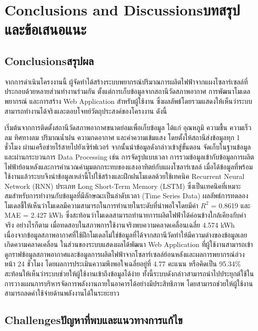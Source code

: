 \chapter{\ifenglish Conclusions and Discussions\else บทสรุปและข้อเสนอแนะ\fi}

\section{\ifenglish Conclusions\else สรุปผล\fi}
\hspace{\parindent} จากการดำเนินโครงงานนี้ ผู้จัดทำได้สร้างระบบพยากรณ์ปริมาณการผลิตไฟฟ้าจากแผงโซลาร์เซลล์ที่ประกอบด้วยหลายส่วนทำงานร่วมกัน ตั้งแต่การเก็บข้อมูลจากสถานีวัดสภาพอากาศ การพัฒนาโมเดลพยากรณ์ และการสร้าง Web Application สำหรับผู้ใช้งาน ซึ่งผลลัพธ์โดยรวมแสดงให้เห็นว่าระบบสามารถทำงานได้จริงและตอบโจทย์วัตถุประสงค์ของโครงงาน ดังนี้

เริ่มต้นจากการติดตั้งสถานีวัดสภาพอากาศขนาดย่อมเพื่อเก็บข้อมูล ได้แก่ อุณหภูมิ ความชื้น ความเร็วลม ทิศทางลม ปริมาณน้ำฝน ความกดอากาศ และค่าความเข้มแสง โดยตั้งให้สถานีส่งข้อมูลทุก 1 ชั่วโมง ผ่านเครือข่ายไร้สายไปยังเซิร์ฟเวอร์ จากนั้นนำข้อมูลดังกล่าวเข้าสู่ขั้นตอน จัดเก็บในฐานข้อมูลและผ่านกระบวนการ Data Processing เช่น การจัดรูปแบบเวลา การรวมข้อมูลเข้ากับข้อมูลการผลิตไฟฟ้าย้อนหลังและการคำนวณค่ามุมตกกระทบของแสงอาทิตย์กับแผงโซลาร์เซลล์ 
เมื่อได้ข้อมูลที่พร้อมใช้งานแล้วระบบจึงนำข้อมูลเหล่านี้ไปใช้สร้างและฝึกฝนโมเดลด้วยใช้เทคนิค Recurrent Neural Network (RNN) ประเภท Long Short-Term Memory (LSTM) ซึ่งเป็นเทคนิคที่เหมาะสมสําหรับการทํางานกับข้อมูลที่มีลักษณะเป็นลําดับเวลา (Time Series Data) ผลลัพธ์การทดลองโมเดลชี้ให้เห็นว่าโมเดลมีความสามารถในการทำนายในระดับที่น่าพอใจโดยมีค่า $R^2$ = 0.8619 และ MAE = 2.427 kWh ซึ่งสะท้อนว่าโมเดลสามารถทำนายการผลิตไฟฟ้าได้ค่อนข้างใกล้เคียงกับค่าจริง 
อย่างไรก็ตาม เมื่อทดสอบในสภาพการใช้งานจริงพบความคลาดเคลื่อนเฉลี่ย 4.574 kWh เนื่องจากข้อมูลสภาพอากาศที่ใช้ฝึกโมเดลไม่ใช่ข้อมูลที่ได้จากสถานีวัดทำให้มีความต่างของข้อมูลเลยเกิดความคลาดเคลี่อน ในส่วนของระบบแสดงผลได้พัฒนา Web Application ที่ผู้ใช้งานสามารถเข้าดูกราฟข้อมูลสภาพอากาศและข้อมูลการผลิตไฟฟ้าจากโซลาร์เซลล์ย้อนหลังและผลการพยากรณ์ล่วงหน้า 24 ชั่วโมง โดยผลการประเมินความพึงพอใจเฉลี่ยอยู่ที่ 4.77 คะแนน หรือคิดเป็น 95.34\%  
สะท้อนให้เห็นว่าระบบช่วยให้ผู้ใช้งานเข้าถึงข้อมูลได้ง่าย ทั้งนี้ระบบดังกล่าวสามารถนําไปประยุกต์ใช้ในการวางแผนการบริหารจัดการพลังงานภายในอาคารได้อย่างมีประสิทธิภาพ โดยสามารถช่วยให้ผู้ใช้งานสามารถลดค่าใช้จ่ายด้านพลังงานได้ในระยะยาว

\section{\ifenglish Challenges\else ปัญหาที่พบและแนวทางการแก้ไข\fi}

